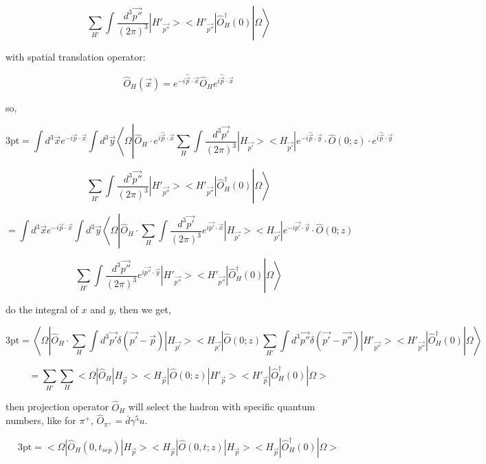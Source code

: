 \documentclass[prd,aps,nofootinbib,floatfix,10pt]{revtex4}
\begin{document}
\[ \left. \left. \sum_{H'} \int \frac{d^3 \vec{p''}}{(2\pi)^3} |H'_{\vec{p''}}><H'_{\vec{p''}}| \hat{O}_{H}^{\dagger}(0)  \right| \Omega\right\rangle \]

with spatial translation operator:

\[ \hat{O}_{H}(\vec{x}) = e^{-i \hat{\vec{p}} \cdot \vec{x}} \hat{O}_{H} e^{i \hat{\vec{p}} \cdot \vec{x}} \]

so,

\[ \text{3pt} = \int d^{3} \vec{x} e^{-i \vec{p} \cdot \vec{x}} \int d^3 \vec{y}\left\langle\Omega\left|\hat{O}_{H} \cdot e^{i \hat{\vec{p}} \cdot \vec{x}} \sum_{H} \int \frac{d^3 \vec{p'}}{(2\pi)^3}  |H_{\vec{p'}}><H_{\vec{p'}}| e^{-i \hat{\vec{p}} \cdot \vec{y}} \cdot \hat{O}(0; z) \cdot e^{i \hat{\vec{p}} \cdot \vec{y}} \right. \right. \]
    
\[ \left. \left. \sum_{H'} \int \frac{d^3 \vec{p''}}{(2\pi)^3} |H'_{\vec{p''}}><H'_{\vec{p''}}| \hat{O}_{H}^{\dagger}(0)  \right| \Omega\right\rangle \]

\[= \int d^{3} \vec{x} e^{-i \vec{p} \cdot \vec{x}} \int d^3 \vec{y}\left\langle\Omega\left|\hat{O}_{H} \cdot \sum_{H} \int \frac{d^3 \vec{p'}}{(2\pi)^3} e^{i \vec{p'} \cdot \vec{x}} |H_{\vec{p'}}><H_{\vec{p'}}| e^{-i \vec{p'} \cdot \vec{y}} \cdot \hat{O}(0; z) \right. \right.\]

\[ \left. \left. \sum_{H'} \int \frac{d^3 \vec{p''}}{(2\pi)^3} e^{i \vec{p''} \cdot \vec{y}} |H'_{\vec{p''}}><H'_{\vec{p''}}| \hat{O}_{H}^{\dagger}(0)  \right| \Omega\right\rangle \]

do the integral of $x$ and $y$, then we get,

\[ \text{3pt} = \left\langle\Omega\left|\hat{O}_{H} \cdot \sum_{H} \int d^3 \vec{p'} \delta(\vec{p'} - \vec{p} ) |H_{\vec{p'}}><H_{\vec{p'}}| \hat{O}(0; z)  \sum_{H'} \int d^3 \vec{p''}  \delta(\vec{p'} - \vec{p''}) |H'_{\vec{p''}}><H'_{\vec{p''}}| \hat{O}_{H}^{\dagger}(0)  \right| \Omega\right\rangle \]

\[ = \sum_{H'} \sum_{H} <\Omega |\hat{O}_{H}  |H_{\vec{p}}><H_{\vec{p}}| \hat{O}(0; z) |H'_{\vec{p}}><H'_{\vec{p}}| \hat{O}_{H}^{\dagger}(0) | \Omega> \]


then projection operator $\hat{O}_{H}$ will select the hadron with specific quantum numbers, like for $\pi^+$, $\hat{O}_{\pi^+} = \bar{d} \gamma^5 u$.

\[ \text{3pt} = <\Omega |\hat{O}_{H} (0, t_{sep})  |H_{\vec{p}}><H_{\vec{p}}| \hat{O}(0, t; z) |H_{\vec{p}}><H_{\vec{p}}| \hat{O}_{H}^{\dagger}(0) | \Omega> \]
\end{document}
